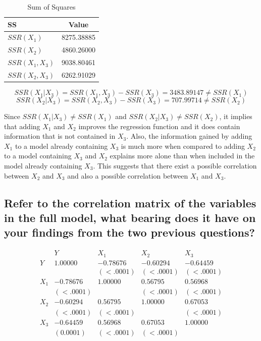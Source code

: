 \documentclass[a4paper,9pt]{article}\usepackage[]{graphicx}\usepackage[]{color}
\begin{document}
\begin{table}[h]
\centering
\begin{tabular}{lc}
\hline
SS & Value\\
\hline
$SSR(X_1)$ & 8275.38885\\
$SSR(X_2)$ & 4860.26000 \\
$SSR(X_1,X_3)$ & 9038.80461\\
$SSR(X_2,X_3)$ & 6262.91029\\
\hline
\end{tabular}
\caption{Sum of Squares}
\end{table}

$$ SSR(X_{1}|X_{3}) = SSR(X_{1},X_{3}) - SSR(X_{3}) = 3483.89147 \neq SSR(X_1)$$
$$ SSR(X_{2}|X_{3}) = SSR(X_{2},X_{3}) - SSR(X_{3}) = 707.99714 \neq SSR(X_2)$$

Since $SSR(X_{1}|X_{3}) \neq SSR(X_1)$ and $SSR(X_{2}|X_{3}) \neq SSR(X_2)$, it implies that adding $X_1$ and $X_2$ improves the regression function and it does contain information that is not contained in $X_3$. Also, the information gained by adding $X_1$ to a model already containing $X_3$ is much more when compared to adding $X_2$ to a model containing $X_3$ and $X_2$ explains more alone than when included in the model already containing $X_3$. This suggests that there exist a possible correlation between $X_2$ and $X_3$ and also a possible correlation between $X_1$ and $X_3$. 

\subsection*{Refer to the correlation matrix of the variables in the full model, what bearing does it have on your findings from the two previous questions?}

$$\begin{array}{c|cccc}
 & Y & X_1 & X_2 & X_3 \\
 \hline
Y & 1.00000 & -0.78676  & -0.60294 & -0.64459\\
 &  & (<.0001) & (<.0001) & (<.0001)\\
 \hline
X_1 & -0.78676 & 1.00000 & 0.56795 & 0.56968\\
 & (<.0001) &  & (<.0001) & (<.0001)\\
 \hline
X_2 & -0.60294  & 0.56795 & 1.00000 & 0.67053 \\
 & (<.0001) & (<.0001) &  & (<.0001)\\
 \hline
X_3 & -0.64459 & 0.56968 & 0.67053 & 1.00000 \\
 & (0.0001) &  (<.0001) & (<.0001) &
\end{array}$$
\end{document}
